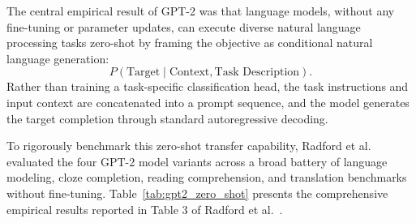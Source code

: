 \documentclass[../../../main.tex]{subfiles}
\begin{document}
The central empirical result of GPT-2 was that language models, without any fine-tuning or parameter updates, can execute diverse natural language processing tasks zero-shot by framing the objective as conditional natural language generation:
\begin{equation}
P(\text{Target} \mid \text{Context}, \text{Task Description}).
\label{eq:zero_shot_conditional}
\end{equation}
Rather than training a task-specific classification head, the task instructions and input context are concatenated into a prompt sequence, and the model generates the target completion through standard autoregressive decoding.

To rigorously benchmark this zero-shot transfer capability, Radford et al. evaluated the four GPT-2 model variants across a broad battery of language modeling, cloze completion, reading comprehension, and translation benchmarks without fine-tuning. Table~\ref{tab:gpt2_zero_shot} presents the comprehensive empirical results reported in Table 3 of Radford et al.~\cite{radford2019}.
\end{document}
